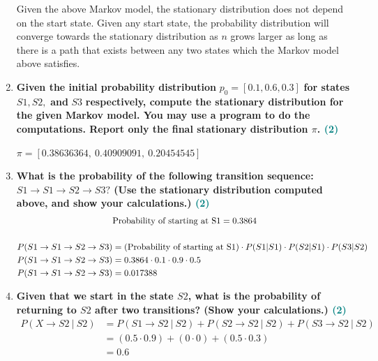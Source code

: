 \documentclass[a4paper]{article}
\begin{document}
\begin{sloppypar}
\begin{enumerate}[start=1,label=Q\arabic*,left=0pt]
    \par Given the above Markov model, the stationary distribution does not depend on the start state. Given any start state,
    the probability distribution will converge towards the stationary distribution as $n$ grows larger as long as there is a path that
    exists between any two states which the Markov model above satisfies.
    
    \item \textbf{Given the initial probability distribution} $p_0 = [0.1, 0.6, 0.3]$ \textbf{for states} $S1, S2,$ \textbf{and} $S3$ \textbf{respectively, compute the stationary distribution for the given Markov model. You may use a program to do the computations. Report only the final stationary distribution ${\pi}$. \hfill \textcolor{teal}{(2)}}

    \par $ \pi = [0.38636364, \: 0.40909091, \: 0.20454545] $
    
    \item \textbf{What is the probability of the following transition sequence: $S1 \rightarrow S1 \rightarrow S2 \rightarrow S3?$ (Use the stationary distribution computed above, and show your calculations.) \hfill \textcolor{teal}{(2)}}
    \begin{align*}
        & \hfill \text{Probability of starting at S1} \hfill = 0.3864 \\\\
        P(S1 \rightarrow S1 \rightarrow S2 \rightarrow S3) &= \text{(Probability of starting at S1)} \cdot P(S1 | S1) \cdot P(S2 | S1) \cdot P(S3 | S2) \\
        P(S1 \rightarrow S1 \rightarrow S2 \rightarrow S3) &= 0.3864 \cdot 0.1 \cdot 0.9 \cdot 0.5 \\
        P(S1 \rightarrow S1 \rightarrow S2 \rightarrow S3) &= 0.017388
    \end{align*}
    
    \item \textbf{Given that we start in the state $S2$, what is the probability of returning to $S2$ after two transitions? (Show your calculations.) \hfill \textcolor{teal}{(2)}}
    \begin{align*}
        P(X \rightarrow S2 \: | \: S2) &= P(S1 \rightarrow S2 \: | \: S2) + P(S2 \rightarrow S2 \: | \: S2) + P(S3 \rightarrow S2 \: | \: S2) \\
        &= (0.5 \cdot 0.9) + (0 \cdot 0) + (0.5 \cdot 0.3) \\
        &= 0.6
    \end{align*}


\end{enumerate}
\end{sloppypar}
\end{document}
